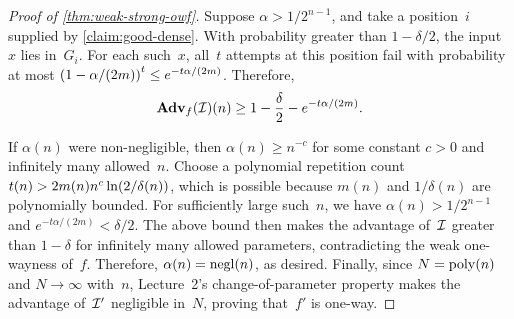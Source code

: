 \documentclass[11pt]{article}
\begin{document}
\begin{proof}[Proof of \cref{thm:weak-strong-owf}]
  Suppose $\alpha>1/2^{n-1}$, and take a position~$i$ supplied by \cref{claim:good-dense}.
  With probability greater than $1-\delta/2$, the input~$x$ lies in~$G_i$.
  For each such~$x$, all~$t$ attempts at this position fail with probability at most $\parens*{1-\alpha/(2m)}^t\leq e^{-t\alpha/(2m)}$.
  Therefore,
  \[
    \advan_f(\Inv)(n)\geq 1-\frac{\delta}{2}-e^{-t\alpha/(2m)}\text.
  \]

  If $\alpha(n)$ were non-negligible, then $\alpha(n)\geq n^{-c}$ for some constant $c>0$ and infinitely many allowed~$n$.
  Choose a polynomial repetition count $t(n)>2m(n)n^c\ln\parens{2/\delta(n)}$, which is possible because $m(n)$ and $1/\delta(n)$ are polynomially bounded.
  For sufficiently large such~$n$, we have $\alpha(n)>1/2^{n-1}$ and $e^{-t\alpha/(2m)}<\delta/2$.
  The above bound then makes the advantage of~$\Inv$ greater than $1-\delta$ for infinitely many allowed parameters, contradicting the weak one-wayness of~$f$.
  Therefore, $\alpha(n)=\negl(n)$, as desired.
  Finally, since $N=\poly(n)$ and $N\to\infty$ with~$n$, Lecture~2's change-of-parameter property makes the advantage of~$\Inv'$ negligible in~$N$, proving that~$f'$ is one-way.
\end{proof}
\end{document}
